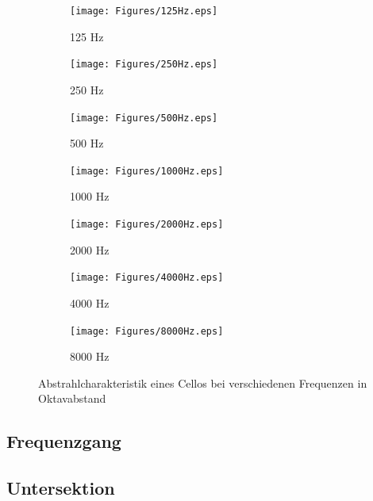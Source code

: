 \begin{figure}[bth]
    \centering
    \begin{subfigure}{.5\textwidth}
        \centering
        \caption{125 Hz}
        \texttt{[image: Figures/125Hz.eps]}
    \end{subfigure}%
    \begin{subfigure}{.5\textwidth}
        \centering
        \caption{250 Hz}
        \texttt{[image: Figures/250Hz.eps]}
    \end{subfigure}

    \vspace{0.5cm}
    \begin{subfigure}{.5\textwidth}
        \centering
        \caption{500 Hz}
        \texttt{[image: Figures/500Hz.eps]}
    \end{subfigure}%
    \begin{subfigure}{.5\textwidth}
        \centering
        \caption{1000 Hz}
        \texttt{[image: Figures/1000Hz.eps]}
    \end{subfigure}

    \vspace{0.5cm}
    \begin{subfigure}{.5\textwidth}
        \centering
        \caption{2000 Hz}
        \texttt{[image: Figures/2000Hz.eps]}
    \end{subfigure}%
    \begin{subfigure}{.5\textwidth}
        \centering
        \caption{4000 Hz}
        \texttt{[image: Figures/4000Hz.eps]}
    \end{subfigure}

    \vspace{0.5cm}
    \begin{subfigure}{.5\textwidth}
        \centering
        \caption{8000 Hz}
        \texttt{[image: Figures/8000Hz.eps]}
    \end{subfigure}

    \caption{Abstrahlcharakteristik eines Cellos bei verschiedenen Frequenzen in Oktavabstand}
    \label{fig:balloon}
\end{figure}


\subsection{Frequenzgang}
\label{subsec:b}
\blindtext


\subsection{Untersektion}
\label{subsec:c}


